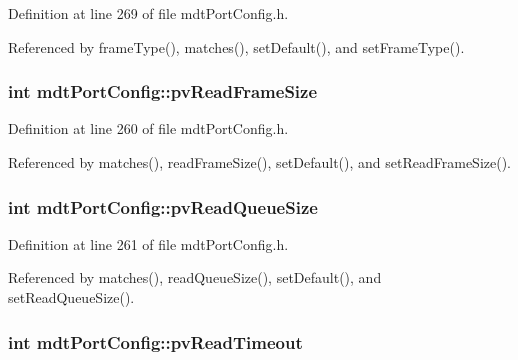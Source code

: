 Definition at line 269 of file mdt\-Port\-Config.\-h.



Referenced by frame\-Type(), matches(), set\-Default(), and set\-Frame\-Type().

\hypertarget{classmdt_port_config_a89f0ded07219e4ddbec5f6f20a3798d5}{
\subsubsection[{pv\-Read\-Frame\-Size}]{\setlength{\rightskip}{0pt plus 5cm}int mdt\-Port\-Config\-::pv\-Read\-Frame\-Size\hspace{0.3cm}{\ttfamily [protected]}}}\label{classmdt_port_config_a89f0ded07219e4ddbec5f6f20a3798d5}


Definition at line 260 of file mdt\-Port\-Config.\-h.



Referenced by matches(), read\-Frame\-Size(), set\-Default(), and set\-Read\-Frame\-Size().

\hypertarget{classmdt_port_config_a999e392fa0d1e97428cef3d45a0f7983}{
\subsubsection[{pv\-Read\-Queue\-Size}]{\setlength{\rightskip}{0pt plus 5cm}int mdt\-Port\-Config\-::pv\-Read\-Queue\-Size\hspace{0.3cm}{\ttfamily [protected]}}}\label{classmdt_port_config_a999e392fa0d1e97428cef3d45a0f7983}


Definition at line 261 of file mdt\-Port\-Config.\-h.



Referenced by matches(), read\-Queue\-Size(), set\-Default(), and set\-Read\-Queue\-Size().

\hypertarget{classmdt_port_config_a69fa9f6cb32469f3eccfe7517dc29101}{
\subsubsection[{pv\-Read\-Timeout}]{\setlength{\rightskip}{0pt plus 5cm}int mdt\-Port\-Config\-::pv\-Read\-Timeout\hspace{0.3cm}{\ttfamily [protected]}}}\label{classmdt_port_config_a69fa9f6cb32469f3eccfe7517dc29101}


